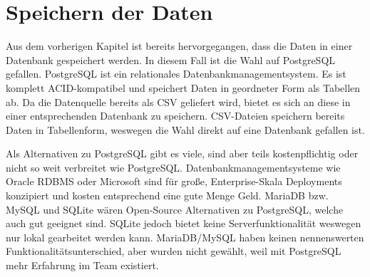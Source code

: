 \chapter{Speichern der Daten}

Aus dem vorherigen Kapitel ist bereits hervorgegangen, dass die Daten in einer Datenbank gespeichert werden.
In diesem Fall ist die Wahl auf PostgreSQL gefallen.
PostgreSQL ist ein relationales Datenbankmanagementsystem. Es ist komplett ACID-kompatibel und speichert Daten in geordneter Form als Tabellen ab.
Da die Datenquelle bereits als CSV geliefert wird, bietet es sich an diese in einer entsprechenden Datenbank zu speichern.
CSV-Dateien speichern bereits Daten in Tabellenform, weswegen die Wahl direkt auf eine Datenbank gefallen ist.

Als Alternativen zu PostgreSQL gibt es viele, sind aber teils kostenpflichtig oder nicht so weit verbreitet wie PostgreSQL.
Datenbankmanagementsysteme wie Oracle RDBMS oder Microsoft sind für große, Enterprise-Skala Deployments konzipiert und kosten entsprechend eine gute Menge Geld.
MariaDB bzw. MySQL und SQLite wären Open-Source Alternativen zu PostgreSQL, welche auch gut geeignet sind.
SQLite jedoch bietet keine Serverfunktionalität weswegen nur lokal gearbeitet werden kann.
MariaDB/MySQL haben keinen nennenswerten Funktionalitätsunterschied, aber wurden nicht gewählt, weil mit PostgreSQL mehr Erfahrung im Team existiert.
